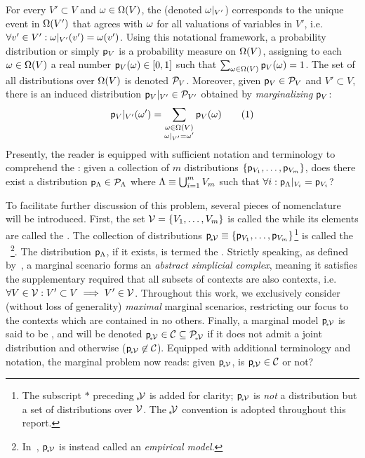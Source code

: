 \documentclass[aps, 10pt, english, twoside, twocolumn, pra, nofootinbib, tightenlines, longbibliography, superscriptaddress]{revtex4-1}
\begin{document}
    For every $V' \subset V$ and $\w \in \events{V}$, the  (denoted ${\omega}|_{V'}$) corresponds to the unique event in $\events{V'}$ that agrees with $\omega$ for all valuations of variables in $V'$, i.e. $\forall v' \in V': \restrict{\w}{V'}\br{v'} = \w\br{v'}$. Using this notational framework, a probability distribution or simply  ${\mathsf{p}}_{V}$ is a probability measure on $\events{V}$, assigning to each $\w \in \events{V}$ a real number $\prob{V}\br{\w} \in \bs{0,1}$ such that $\sum_{\w \in \events{V}} \prob{V}\br{\w} = 1$. The set of all distributions over $\events{V}$ is denoted $\mathcal{P}_{V}$. Moreover, given ${\mathsf{p}}_{V} \in \mathcal{P}_{V}$ and $V' \subset V$, there is an induced distribution ${{\mathsf{p}}_{V}}|_{V'} \in \mathcal{P}_{V'}$ obtained by \textit{marginalizing} ${\mathsf{p}}_{V}$:
    \[ \restrict{\prob{V}}{V'}\br{\w'} = \sum_{\substack{\w \in \events{V} \\ \restrict{\w}{V'} = \w'}} \prob{V}\br{\w} \eq \label{eq:marginalization_defined} \]
    Presently, the reader is equipped with sufficient notation and terminology to comprehend the : given a collection of $m$ distributions $\bc{\prob{V_1},\ldots,\prob{V_m}}$, does there exist a distribution ${\mathsf{p}}_{\Lambda} \in \mathcal{P}_{\Lambda}$ where $\Lambda \equiv \bigcup_{i = 1}^{m} V_m$ such that $\forall i : {{\mathsf{p}}_{\Lambda}}|_{V_i} = {\mathsf{p}}_{V_i}$?

    To facilitate further discussion of this problem, several pieces of nomenclature will be introduced. First, the set $\mscenario = \bc{V_1, \ldots, V_m}$ is called the  while its elements are called the . The collection of distributions $\prob{\mscenariowrap} \defined \bc{\prob{V_1},\ldots,\prob{V_m}}$\footnote{The subscript $*$ preceding $\!{}_*\!\mathcal{V}$ is added for clarity; ${\mathsf{p}}_{\!{}_*\!\mathcal{V}}$ is \textit{not} a distribution but a set of distributions over $\mathcal{V}$. The $\!{}_*\!\mathcal{V}$ convention is adopted throughout this report.} is called the ~\cite{Fritz_2011}\footnote{In~\cite{Abramsky_2011}, ${\mathsf{p}}_{\!{}_*\!\mathcal{V}}$ is instead called an \textit{empirical model}.}. The distribution ${\mathsf{p}}_{\Lambda}$, if it exists, is termed the . Strictly speaking, as defined by~\cite{Fritz_2011}, a marginal scenario forms an \textit{abstract simplicial complex}, meaning it satisfies the supplementary required that all subsets of contexts are also contexts, i.e. $\forall V \in \mathcal{V} : V' \subset V \implies V' \in \mathcal{V}$. Throughout this work, we exclusively consider (without loss of generality) \textit{maximal} marginal scenarios, restricting our focus to the contexts which are contained in no others. Finally, a marginal model ${\mathsf{p}}_{\!{}_*\!\mathcal{V}}$ is said to be , and will be denoted ${\mathsf{p}}_{\!{}_*\!\mathcal{V}} \in \mathcal{C} \subseteq \mathcal{P}_{\!{}_*\!\mathcal{V}}$ if it does not admit a joint distribution and  otherwise (${\mathsf{p}}_{\!{}_*\!\mathcal{V}} \not \in \mathcal{C}$). Equipped with additional terminology and notation, the marginal problem now reads: given ${\mathsf{p}}_{\!{}_*\!\mathcal{V}}$, is ${\mathsf{p}}_{\!{}_*\!\mathcal{V}} \in \mathcal{C}$ or not?
\end{document}
